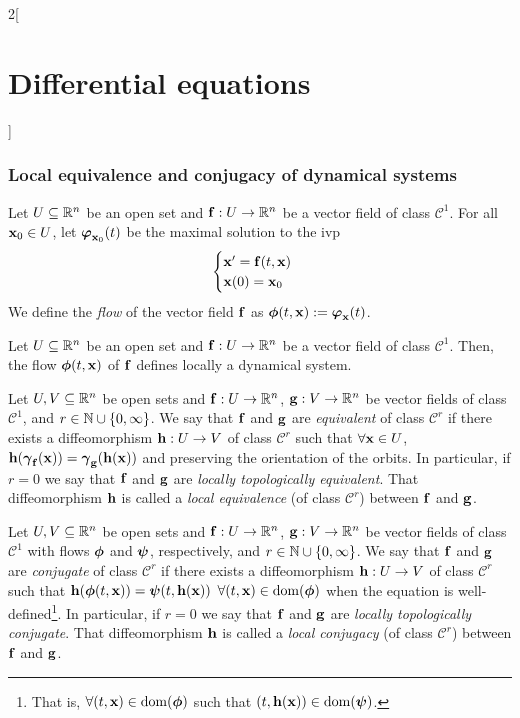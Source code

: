 \documentclass[../../../main_math.tex]{subfiles}
\begin{document}
\begin{multicols}{2}[\section{Differential equations}]
  \subsubsection{Local equivalence and conjugacy of dynamical systems}
  \begin{definition}
    Let $U\subseteq \mathbb{R}^n$ be an open set and $\boldsymbol{\mathrm{f}}:U\rightarrow\mathbb{R}^n$ be a vector field of class $\mathcal{C}^1$. For all $\boldsymbol{\mathrm{x}}_0\in U$, let $\boldsymbol{\mathrm{\varphi}}_{\boldsymbol{\mathrm{x}}_0}(t)$ be the maximal solution to the ivp
    $$
      \begin{cases}
        \boldsymbol{\mathrm{x}}'      =\boldsymbol{\mathrm{f}}(t,\boldsymbol{\mathrm{x}}) \\
        \boldsymbol{\mathrm{x}}(0)  =\boldsymbol{\mathrm{x}}_0
      \end{cases}
    $$
    We define the \emph{flow} of the vector field $\boldsymbol{\mathrm{f}}$ as $\boldsymbol{\mathrm{\phi}}(t,\boldsymbol{\mathrm{x}}):=\boldsymbol{\mathrm{\varphi}}_{\boldsymbol{\mathrm{x}}}(t)$.
  \end{definition}
  \begin{proposition}
    Let $U\subseteq \mathbb{R}^n$ be an open set and $\boldsymbol{\mathrm{f}}:U\rightarrow\mathbb{R}^n$ be a vector field of class $\mathcal{C}^1$. Then, the flow $\boldsymbol{\mathrm{\phi}}(t,\boldsymbol{\mathrm{x}})$ of $\boldsymbol{\mathrm{f}}$ defines locally a dynamical system.
  \end{proposition}
  \begin{definition}
    Let $U,V\subseteq \mathbb{R}^n$ be open sets and $\boldsymbol{\mathrm{f}}:U\rightarrow\mathbb{R}^n$, $\boldsymbol{\mathrm{g}}:V\rightarrow\mathbb{R}^n$ be vector fields of class $\mathcal{C}^1$, and $r\in\mathbb{N}\cup\{0,\infty\}$. We say that $\boldsymbol{\mathrm{f}}$ and $\boldsymbol{\mathrm{g}}$ are \emph{equivalent} of class $\mathcal{C}^r$ if there exists a diffeomorphism $\boldsymbol{\mathrm{h}}:U\rightarrow V$ of class $\mathcal{C}^r$ such that $\forall \boldsymbol{\mathrm{x}}\in U$, $\boldsymbol{\mathrm{h}}(\boldsymbol{\mathrm{\gamma}}_{\boldsymbol{\mathrm{f}}}(\boldsymbol{\mathrm{x}}))=\boldsymbol{\mathrm{\gamma}}_{\boldsymbol{\mathrm{g}}}(\boldsymbol{\mathrm{h}}(\boldsymbol{\mathrm{x}}))$ and preserving the orientation of the orbits. In particular, if $r=0$ we say that $\boldsymbol{\mathrm{f}}$ and $\boldsymbol{\mathrm{g}}$ are \emph{locally topologically equivalent}. That diffeomorphism $\boldsymbol{\mathrm{h}}$ is called a \emph{local equivalence} (of class $\mathcal{C}^r$) between $\boldsymbol{\mathrm{f}}$ and $\boldsymbol{\mathrm{g}}$.
  \end{definition}
  \begin{definition}
    Let $U,V\subseteq \mathbb{R}^n$ be open sets and $\boldsymbol{\mathrm{f}}:U\rightarrow\mathbb{R}^n$, $\boldsymbol{\mathrm{g}}:V\rightarrow\mathbb{R}^n$ be vector fields of class $\mathcal{C}^1$ with flows $\boldsymbol{\mathrm{\phi}}$ and $\boldsymbol{\mathrm{\psi}}$, respectively, and $r\in\mathbb{N}\cup\{0,\infty\}$. We say that $\boldsymbol{\mathrm{f}}$ and $\boldsymbol{\mathrm{g}}$ are \emph{conjugate} of class $\mathcal{C}^r$ if there exists a diffeomorphism $\boldsymbol{\mathrm{h}}:U\rightarrow V$ of class $\mathcal{C}^r$ such that $\boldsymbol{\mathrm{h}}(\boldsymbol{\mathrm{\phi}}(t,\boldsymbol{\mathrm{x}}))=\boldsymbol{\mathrm{\psi}}(t,\boldsymbol{\mathrm{h}}(\boldsymbol{\mathrm{x}}))$ $\forall(t,\boldsymbol{\mathrm{x}})\in \operatorname{dom}(\boldsymbol{\mathrm{\phi}})$ when the equation is well-defined\footnote{That is, $\forall(t,\boldsymbol{\mathrm{x}})\in \operatorname{dom}(\boldsymbol{\mathrm{\phi}})$ such that $(t,\boldsymbol{\mathrm{h}}(\boldsymbol{\mathrm{x}}))\in \operatorname{dom}(\boldsymbol{\mathrm{\psi}})$.}. In particular, if $r=0$ we say that $\boldsymbol{\mathrm{f}}$ and $\boldsymbol{\mathrm{g}}$ are \emph{locally topologically conjugate}. That diffeomorphism $\boldsymbol{\mathrm{h}}$ is called a \emph{local conjugacy} (of class $\mathcal{C}^r$) between $\boldsymbol{\mathrm{f}}$ and $\boldsymbol{\mathrm{g}}$.

\end{definition}
\end{multicols}
\end{document}
